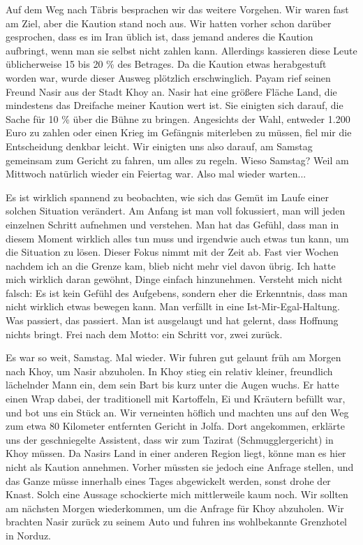 Auf dem Weg nach Täbris besprachen wir das weitere Vorgehen. Wir waren fast am Ziel, aber die Kaution stand noch aus. Wir hatten vorher schon darüber gesprochen, dass es im Iran üblich ist, dass jemand anderes die Kaution aufbringt, wenn man sie selbst nicht zahlen kann. Allerdings kassieren diese Leute üblicherweise 15 bis 20 \% des Betrages. Da die Kaution etwas herabgestuft worden war, wurde dieser Ausweg plötzlich erschwinglich. Payam rief seinen Freund Nasir aus der Stadt Khoy an. Nasir hat eine größere Fläche Land, die mindestens das Dreifache meiner Kaution wert ist. Sie einigten sich darauf, die Sache für 10 \% über die Bühne zu bringen. Angesichts der Wahl, entweder 1.200 Euro zu zahlen oder einen Krieg im Gefängnis miterleben zu müssen, fiel mir die Entscheidung denkbar leicht. Wir einigten uns also darauf, am Samstag gemeinsam zum Gericht zu fahren, um alles zu regeln. Wieso Samstag? Weil am Mittwoch natürlich wieder ein Feiertag war. Also mal wieder warten...

Es ist wirklich spannend zu beobachten, wie sich das Gemüt im Laufe einer solchen Situation verändert. Am Anfang ist man voll fokussiert, man will jeden einzelnen Schritt aufnehmen und verstehen. Man hat das Gefühl, dass man in diesem Moment wirklich alles tun muss und irgendwie auch etwas tun kann, um die Situation zu lösen. Dieser Fokus nimmt mit der Zeit ab. Fast vier Wochen nachdem ich an die Grenze kam, blieb nicht mehr viel davon übrig. Ich hatte mich wirklich daran gewöhnt, Dinge einfach hinzunehmen. Versteht mich nicht falsch: Es ist kein Gefühl des Aufgebens, sondern eher die Erkenntnis, dass man nicht wirklich etwas bewegen kann. Man verfällt in eine Ist-Mir-Egal-Haltung. Was passiert, das passiert. Man ist ausgelaugt und hat gelernt, dass Hoffnung nichts bringt. Frei nach dem Motto: ein Schritt vor, zwei zurück.

Es war so weit, Samstag. Mal wieder. Wir fuhren gut gelaunt früh am Morgen nach Khoy, um Nasir abzuholen. In Khoy stieg ein relativ kleiner, freundlich lächelnder Mann ein, dem sein Bart bis kurz unter die Augen wuchs. Er hatte einen Wrap dabei, der traditionell mit Kartoffeln, Ei und Kräutern befüllt war, und bot uns ein Stück an. Wir verneinten höflich und machten uns auf den Weg zum etwa 80 Kilometer entfernten Gericht in Jolfa. Dort angekommen, erklärte uns der geschniegelte Assistent, dass wir zum Tazirat (Schmugglergericht) in Khoy müssen. Da Nasirs Land in einer anderen Region liegt, könne man es hier nicht als Kaution annehmen. Vorher müssten sie jedoch eine Anfrage stellen, und das Ganze müsse innerhalb eines Tages abgewickelt werden, sonst drohe der Knast. Solch eine Aussage schockierte mich mittlerweile kaum noch. Wir sollten am nächsten Morgen wiederkommen, um die Anfrage für Khoy abzuholen. Wir brachten Nasir zurück zu seinem Auto und fuhren ins wohlbekannte Grenzhotel in Norduz.

